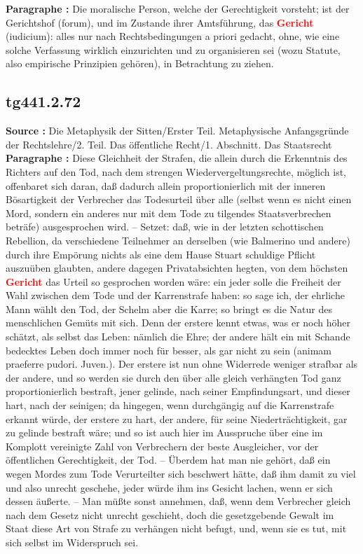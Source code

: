 \documentclass[a4paper,12pt,twoside]{book}
\newcommand{\match}[1]{\textcolor{red}{\textbf{#1}}}
\begin{document}
	\textbf{Paragraphe : }Die moralische Person, welche der Gerechtigkeit vorsteht; ist der Gerichtshof (forum), und im Zustande ihrer Amtsführung, das \match{Gericht} (iudicium): alles nur nach Rechtsbedingungen a priori gedacht, ohne, wie eine solche Verfassung wirklich einzurichten und zu organisieren sei (wozu Statute, also empirische Prinzipien gehören), in Betrachtung zu ziehen. 
	
	\subsection*{tg441.2.72} 
	\textbf{Source : }Die Metaphysik der Sitten/Erster Teil. Metaphysische Anfangsgründe der Rechtslehre/2. Teil. Das öffentliche Recht/1. Abschnitt. Das Staatsrecht\\  
	
	\textbf{Paragraphe : }Diese Gleichheit der Strafen, die allein durch die Erkenntnis des Richters auf den Tod, nach dem strengen Wiedervergeltungsrechte, möglich ist, offenbaret sich daran, daß dadurch allein proportionierlich mit der inneren Bösartigkeit der Verbrecher das Todesurteil über alle (selbst wenn es nicht einen Mord, sondern ein anderes nur mit dem Tode zu tilgendes Staatsverbrechen beträfe) ausgesprochen wird. – Setzet: daß, wie in der letzten schottischen Rebellion, da verschiedene Teilnehmer an derselben (wie Balmerino und andere) durch ihre Empörung nichts als eine dem Hause Stuart schuldige Pflicht auszuüben glaubten, andere dagegen Privatabsichten hegten, von dem höchsten \match{Gericht} das Urteil so gesprochen worden wäre: ein jeder solle die Freiheit der Wahl zwischen dem Tode und der Karrenstrafe haben: so sage ich, der ehrliche Mann wählt den Tod, der Schelm aber die Karre; so bringt es die Natur des menschlichen Gemüts mit sich. Denn der erstere kennt etwas, was er noch höher schätzt, als selbst das Leben: nämlich die
	Ehre; der andere hält ein mit Schande bedecktes Leben doch immer noch für besser, als gar nicht zu sein (animam praeferre pudori. Juven.). Der erstere ist nun ohne Widerrede weniger strafbar als der andere, und so werden sie durch den über alle gleich verhängten Tod ganz proportionierlich bestraft, jener gelinde, nach seiner Empfindungsart, und dieser hart, nach der seinigen; da hingegen, wenn durchgängig auf die Karrenstrafe erkannt würde, der erstere zu hart, der andere, für seine Niederträchtigkeit, gar zu gelinde bestraft wäre; und so ist auch hier im Ausspruche über eine im Komplott vereinigte Zahl von Verbrechern der beste Ausgleicher, vor der öffentlichen Gerechtigkeit, der Tod. – Überdem hat man nie gehört, daß ein wegen Mordes zum Tode Verurteilter sich beschwert hätte, daß ihm damit zu viel und also unrecht geschehe, jeder würde ihm ins Gesicht lachen, wenn er sich dessen äußerte. – Man müßte sonst annehmen, daß, wenn dem Verbrecher gleich nach dem Gesetz nicht unrecht geschieht, doch die gesetzgebende Gewalt im Staat diese Art von Strafe zu verhängen nicht befugt, und, wenn sie es tut, mit sich selbst im Widerspruch sei. 
	
\end{document}
